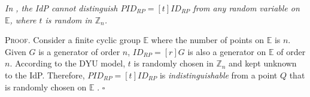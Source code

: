 \vspace{1mm}
 {\em In \usso, the IdP cannot distinguish $PID_{RP} = [t]ID_{RP}$ from any random variable on $\mathbb{E}$, where $t$ is random in $\mathbb{Z}_n$.} %

\vspace{0.75mm}
\noindent \textsc{Proof.}
Consider a finite cyclic group $\mathbb{E}$ where the number of points on $\mathbb{E}$ is $n$. Given $G$ is a generator of order $n$, $ID_{RP} = [r]G$ is also a generator on $\mathbb{E}$ of order $n$. According to the DYU model, $t$ is randomly chosen in $\mathbb{Z}_n$ and kept unknown to the IdP. Therefore, $PID_{RP} = [t]ID_{RP}$ is \emph{indistinguishable} from a point $Q$ that is randomly chosen on $\mathbb{E}$ \cite{oprf-proved,strong-oprf}. \hfill $\square$





